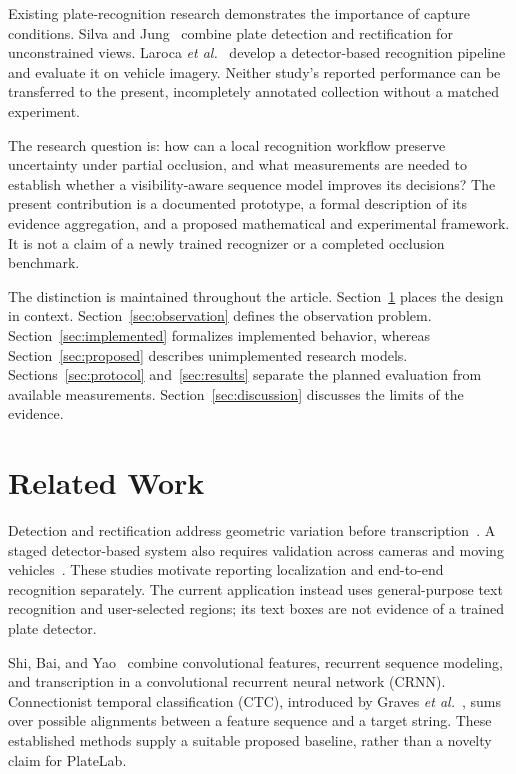 \documentclass[journal]{IEEEtran}
\begin{document}
Existing plate-recognition research demonstrates the importance of capture conditions. Silva and Jung~\cite{silva2018} combine plate detection and rectification for unconstrained views. Laroca \emph{et al.}~\cite{laroca2018} develop a detector-based recognition pipeline and evaluate it on vehicle imagery. Neither study's reported performance can be transferred to the present, incompletely annotated collection without a matched experiment.

The research question is: how can a local recognition workflow preserve uncertainty under partial occlusion, and what measurements are needed to establish whether a visibility-aware sequence model improves its decisions? The present contribution is a documented prototype, a formal description of its evidence aggregation, and a proposed mathematical and experimental framework. It is not a claim of a newly trained recognizer or a completed occlusion benchmark.

The distinction is maintained throughout the article. Section~\ref{sec:related} places the design in context. Section~\ref{sec:observation} defines the observation problem. Section~\ref{sec:implemented} formalizes implemented behavior, whereas Section~\ref{sec:proposed} describes unimplemented research models. Sections~\ref{sec:protocol} and~\ref{sec:results} separate the planned evaluation from available measurements. Section~\ref{sec:discussion} discusses the limits of the evidence.

\section{Related Work}\label{sec:related}
Detection and rectification address geometric variation before transcription~\cite{silva2018}. A staged detector-based system also requires validation across cameras and moving vehicles~\cite{laroca2018}. These studies motivate reporting localization and end-to-end recognition separately. The current application instead uses general-purpose text recognition and user-selected regions; its text boxes are not evidence of a trained plate detector.

Shi, Bai, and Yao~\cite{shi2017} combine convolutional features, recurrent sequence modeling, and transcription in a convolutional recurrent neural network (CRNN). Connectionist temporal classification (CTC), introduced by Graves \emph{et al.}~\cite{graves2006}, sums over possible alignments between a feature sequence and a target string. These established methods supply a suitable proposed baseline, rather than a novelty claim for PlateLab.
\end{document}

